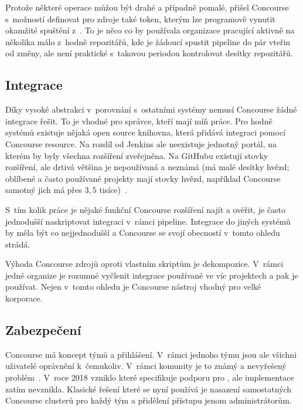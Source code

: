         Protože některé  operace můžou být drahé a případně pomalé, přišel Concourse s~možností definovat pro zdroje také token, kterým lze programově vynutit okamžité spuštění  z~. To je něco co by používala organizace pracující aktivně na několika málo z~hodně repozitářů, kde je žádoucí spustit pipeline do pár vteřin od změny, ale není praktické s~takovou periodou kontrolovat desítky repozitářů.

    \subsection{Integrace}
        Díky vysoké abstrakci v~porovnání s~ostatními \CI systémy nemusí Concourse žádné integrace řešit. To je vhodné pro správce, kteří mají míň práce. Pro hodně systémů existuje nějaká open source knihovna, která přidává integraci pomocí Concourse resource. Na rozdíl od Jenkins ale neexistuje jednotný portál, na kterém by byly všechna rozšíření zveřejněna. Na GitHubu existují stovky rozšíření, ale drtivá většina je nepoužívaná a neznámá (má malé desítky hvězd; oblíbené a často používané projekty mají stovky hvězd, například Concourse samotný jich má přes $3,5$ tisíce)~\cite{concourse-resource-list}.

        S~tím kolik práce je nějaké funkční Concourse rozšíření najít a ověřit, je často jednodušší naskriptovat integraci v~rámci pipeline. Integrace \CI do jiných systémů by měla být co nejjednodušší a Concourse se svojí obecností v~tomto ohledu strádá.

        Výhoda Concourse zdrojů oproti vlastním skriptům je dekompozice. V~rámci jedné organize je rozumné vyčlenit integrace používané ve víc projektech a pak je používat. Nejen v~tomto ohledu je Concourse nástroj vhodný pro velké korporace.

    \subsection{Zabezpečení}
        \label{subsec:concourse-security}

        Concourse má koncept týmů a přihlášení. V~rámci jednoho týmu jsou ale všichni uživatelé oprávnění k~čemukoliv. V~rámci komunity je to známý a nevyřešený problém~\cite{concourse-issue-1317}. V~roce 2018 vzniklo  které specifikuje podporu pro , ale implementace zatím nevznikla. Klasické řešení které se nyní používá je nasazení samostatných Concourse clusterů pro každý tým a přidělení přístupu jenom administrátorům.

